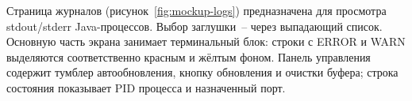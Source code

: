 










Страница журналов (рисунок~\ref{fig:mockup-logs}) предназначена для просмотра stdout/stderr Java-процессов. Выбор заглушки~-- через выпадающий список. Основную часть экрана занимает терминальный блок: строки с ERROR и WARN выделяются соответственно красным и жёлтым фоном. Панель управления содержит тумблер автообновления, кнопку обновления и очистки буфера; строка состояния показывает PID процесса и назначенный порт.


